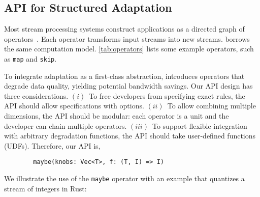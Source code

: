 \subsection{API for Structured Adaptation}
\label{sec:structure-adapt}

Most stream processing systems construct applications as a directed graph of
operators~\cite{toshniwal2014storm, zaharia2013discretized}. Each operator
transforms input streams into new streams. \sysname{} borrows the same
computation model.  \autoref{tab:operators} lists some example operators, such
as \texttt{map} and \texttt{skip}.

To integrate adaptation as a first-class abstraction, \sysname{} introduces
\maybe{} operators that degrade data quality, yielding potential bandwidth
savings.  Our API design has three considerations.  $(i)$~To free developers
from specifying exact rules, the API should allow specifications with
options. $(ii)$~To allow combining multiple dimensions, the API should be
modular: each operator is a unit and the developer can chain multiple
operators. $(iii)$~To support flexible integration with arbitrary degradation
functions, the API should take user-defined functions (UDFs). Therefore, our API
is,

\vspace{-2pt}
\begin{lstlisting}
        maybe(knobs: Vec<T>, f: (T, I) => I)
\end{lstlisting}

We illustrate the use of the \texttt{maybe} operator with an example that
quantizes a stream of integers in Rust:

